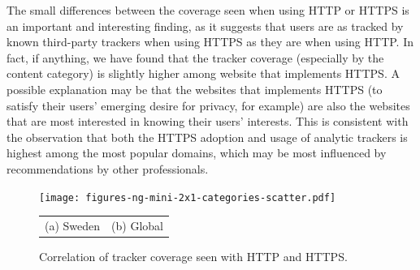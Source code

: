 \documentclass[letterpaper]{sig-alternate-10pt}
\begin{document}
The small differences between the coverage seen when using HTTP or HTTPS 
is an important and interesting finding, as it suggests that users 
are as tracked by known third-party trackers when using HTTPS as they are when using HTTP.
In fact, if anything, we have found that the tracker coverage 
(especially by the content category)
is slightly higher among website that implements HTTPS.
A possible explanation may be that the websites
that implements HTTPS (to satisfy their users' emerging desire for privacy, for example)
are also the websites that are most interested in knowing their users' interests.
This is consistent with the observation that both the HTTPS adoption
and usage of analytic trackers is highest among the most popular domains,
which may be most influenced by recommendations by other professionals.

\begin{figure}[t]
\centering
\texttt{[image: figures-ng-mini-2x1-categories-scatter.pdf]}
\begin{tabular}{cc}
(a) Sweden &
(b) Global \\
\end{tabular}
\vspace{-12pt}
\caption{Correlation of tracker coverage seen with HTTP and HTTPS.}
\label{fig:scatter}
\vspace{-12pt}
\end{figure}
\end{document}
